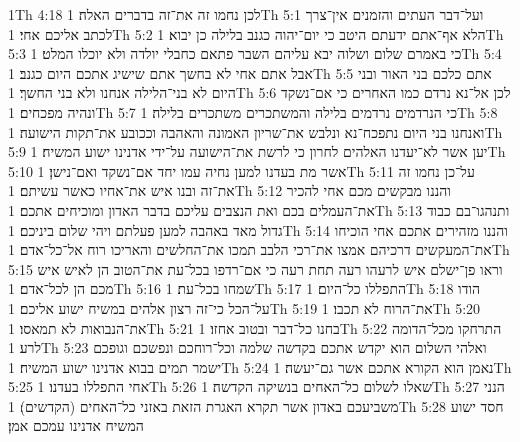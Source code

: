 1Th 4:18  לכן נחמו זה את־זה בדברים האלה׃
1Th 5:1  ועל־דבר העתים והזמנים אין־צרך לכתב אליכם אחי׃
1Th 5:2  הלא אף־אתם ידעתם היטב כי יום־יהוה כגנב בלילה כן יבוא׃
1Th 5:3  כי באמרם שלום ושלוה יבא עליהם השבר פתאם כחבלי יולדה ולא יוכלו המלט׃
1Th 5:4  אבל אתם אחי לא בחשך אתם שישיג אתכם היום כגנב׃
1Th 5:5  אתם כלכם בני האור ובני היום לא בני־הלילה אנחנו ולא בני החשך׃
1Th 5:6  לכן אל־נא נרדם כמו האחרים כי אם־נשקד ונהיה מפכחים׃
1Th 5:7  כי הנרדמים נרדמים בלילה והמשתכרים משתכרים בלילה׃
1Th 5:8  ואנחנו בני היום נתפכח־נא ונלבש את־שריון האמונה והאהבה וככובע את־תקות הישועה׃
1Th 5:9  יען אשר לא־יעדנו האלהים לחרון כי לרשת את־הישועה על־ידי אדנינו ישוע המשיח׃
1Th 5:10  אשר מת בעדנו למען נחיה עמו יחד אם־נשקד ואם־נישן׃
1Th 5:11  על־כן נחמו זה את־זה ובנו איש את־אחיו כאשר עשיתם׃
1Th 5:12  והננו מבקשים מכם אחי להכיר את־העמלים בכם ואת הנצבים עליכם בדבר האדון ומוכיחים אתכם׃
1Th 5:13  ותנהגו־בם כבוד גדול מאד באהבה למען פעלתם ויהי שלום ביניכם׃
1Th 5:14  והננו מזהירים אתכם אחי הוכיחו את־המעקשים דרכיהם אמצו את־רכי הלבב תמכו את־החלשים והאריכו רוח אל־כל־אדם׃
1Th 5:15  וראו פן־ישלם איש לרעהו רעה תחת רעה כי אם־רדפו בכל־עת את־הטוב הן לאיש איש מכם הן לכל־אדם׃
1Th 5:16  שמחו בכל־עת׃
1Th 5:17  התפללו כל־היום׃
1Th 5:18  הודו על־הכל כי־זה רצון אלהים במשיח ישוע אליכם׃
1Th 5:19  את־הרוח לא תכבו׃
1Th 5:20  את־הנבואות לא תמאסו׃
1Th 5:21  בחנו כל־דבר ובטוב אחזו׃
1Th 5:22  התרחקו מכל־הדומה לרע׃
1Th 5:23  ואלהי השלום הוא יקדש אתכם בקדשה שלמה וכל־רוחכם ונפשכם וגופכם ישמר תמים בבוא אדנינו ישוע המשיח׃
1Th 5:24  נאמן הוא הקורא אתכם אשר גם־יעשה׃
1Th 5:25  אחי התפללו בעדנו׃
1Th 5:26  שאלו לשלום כל־האחים בנשיקה הקדשה׃
1Th 5:27  הנני משביעכם באדון אשר תקרא האגרת הזאת באזני כל־האחים (הקדשים)׃
1Th 5:28  חסד ישוע המשיח אדנינו עמכם אמן׃



